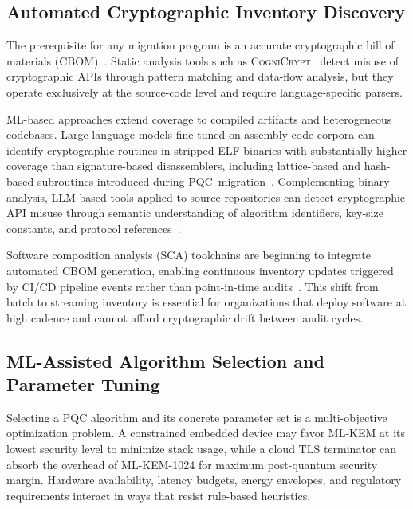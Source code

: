 \documentclass[journal]{IEEEtran}
\begin{document}
\subsection{Automated Cryptographic Inventory Discovery}
\label{subsec:inventory}

The prerequisite for any migration program is an accurate cryptographic
bill of materials (CBOM)~\cite{owasp2023cbom}. Static analysis tools such
as \textsc{CogniCrypt}~\cite{kruger2019cognicrypt} detect misuse of
cryptographic APIs through pattern matching and data-flow analysis, but
they operate exclusively at the source-code level and require
language-specific parsers.

ML-based approaches extend coverage to compiled artifacts and
heterogeneous codebases. Large language models fine-tuned on assembly code
corpora can identify cryptographic routines in stripped ELF binaries with
substantially higher coverage than signature-based disassemblers, including
lattice-based and hash-based subroutines introduced during
PQC~migration~\cite{shang2025foc}. Complementing binary analysis, LLM-based
tools applied to source repositories can detect cryptographic API misuse
through semantic understanding of algorithm identifiers, key-size constants,
and protocol references~\cite{baek2024cryptollm}.

Software composition analysis (SCA) toolchains are beginning to integrate
automated CBOM generation, enabling continuous inventory updates triggered
by CI/CD pipeline events rather than point-in-time audits~\cite{owasp2023cbom}.
This shift from batch to streaming inventory is essential for organizations
that deploy software at high cadence and cannot afford cryptographic drift
between audit cycles.

\subsection{ML-Assisted Algorithm Selection and Parameter Tuning}
\label{subsec:selection}

Selecting a PQC algorithm and its concrete parameter set is a
multi-objective optimization problem. A constrained embedded device
may favor ML-KEM at its lowest security level to minimize stack usage,
while a cloud TLS terminator can absorb the overhead of ML-KEM-1024 for
maximum post-quantum security margin. Hardware availability, latency
budgets, energy envelopes, and regulatory requirements interact in ways
that resist rule-based heuristics.
\end{document}
